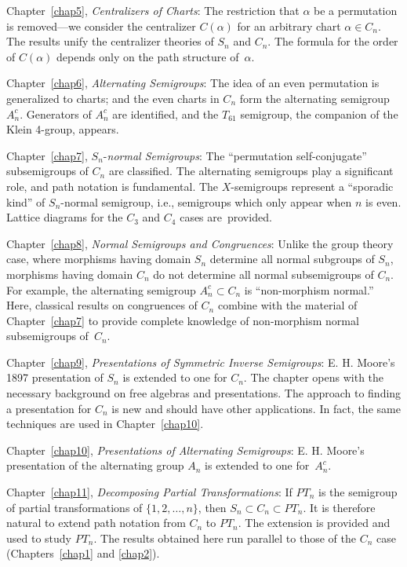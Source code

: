 \documentclass{surv-l}
\numberwithin{equation}{section}
\numberwithin{table}{section}
\numberwithin{figure}{section}
\theoremstyle{definition}
\begin{document}
Chapter~\ref{chap5}, \emph{Centralizers of Charts}: The
restriction that $\alpha$ be a permutation is removed---we
consider the centralizer $C(\alpha)$ for an arbitrary chart
$\alpha\in C_{n}$. The results unify the centralizer theories of
$S_{n}$ and $C_{n}$. The formula for the order of $C(\alpha)$
depends only on the path structure of~$\alpha$.

Chapter~\ref{chap6}, \emph{Alternating Semigroups}: The idea of an
even permutation is generalized to charts; and the even charts in
$C_{n}$ form the alternating semigroup $A_{n}^{c}$. Generators of
$A_{n}^{c}$ are identified, and the $T_{61}$ semigroup, the
companion of the Klein 4-group, appears.

Chapter~\ref{chap7}, $S_{n}$-\emph{normal Semigroups}: The
``permutation self-conjugate'' subsemigroups of $C_{n}$ are
classified. The alternating semigroups play a significant role,
and path notation is fundamental. The
$X$-semigroups represent a ``sporadic kind''
of $S_{n}$-normal semigroup, i.e., semigroups which only appear
when $n$ is even. Lattice diagrams for the $C_{3}$ and $C_{4}$
cases are~provided.

Chapter~\ref{chap8}, \emph{Normal Semigroups and Congruences}:
Unlike the group theory case, where morphisms having domain
$S_{n}$ determine all normal subgroups of $S_{n}$, morphisms
having domain $C_{n}$ do not determine all normal subsemigroups of
$C_{n}$. For example, the alternating semigroup $A_{n}^{c}\subset
C_{n}$ is ``non-morphism normal.'' Here, classical results on
congruences of $C_{n}$ combine with the material of
Chapter~\ref{chap7} to provide complete knowledge of non-morphism
normal subsemigroups of~$C_{n}$.

Chapter~\ref{chap9}, \emph{Presentations of Symmetric Inverse
Semigroups}: E. H. Moore's 1897 presentation of
$S_{n}$ is extended to one for $C_{n}$. The chapter opens with the
necessary background on free algebras and presentations. The
approach to finding a presentation for $C_{n}$ is new and should
have other applications. In fact, the same techniques are used in
Chapter~\ref{chap10}.

Chapter~\ref{chap10}, \emph{Presentations of Alternating
Semigroups}: E. H. Moore's presentation of the alternating group
$A_{n}$ is extended to one for~$A_{n}^{c}$.

Chapter~\ref{chap11}, \emph{Decomposing Partial Transformations}:
If $PT_{n}$ is the semigroup of partial transformations of $\{1,
2, \ldots,n\}$, then $S_{n}\subset C_{n}\subset PT_{n}$. It is
therefore natural to extend path notation from $C_{n}$ to
$PT_{n}$. The extension is provided and used to study $PT_{n}$.
The results obtained here run parallel to those of the $C_{n}$
case (Chapters~\ref{chap1} and \ref{chap2}).
\end{document}
